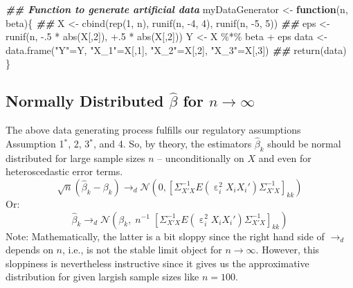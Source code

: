 \documentclass[
  14pt,
]{memoir}
\newenvironment{Shaded}{\begin{snugshade}}{\end{snugshade}}
\newcommand{\ControlFlowTok}[1]{\textcolor[rgb]{0.13,0.29,0.53}{\textbf{#1}}}
\newcommand{\DecValTok}[1]{\textcolor[rgb]{0.00,0.00,0.81}{#1}}
\newcommand{\DocumentationTok}[1]{\textcolor[rgb]{0.56,0.35,0.01}{\textbf{\textit{#1}}}}
\newcommand{\FunctionTok}[1]{\textcolor[rgb]{0.00,0.00,0.00}{#1}}
\newcommand{\NormalTok}[1]{#1}
\newcommand{\OtherTok}[1]{\textcolor[rgb]{0.56,0.35,0.01}{#1}}
\newcommand{\SpecialCharTok}[1]{\textcolor[rgb]{0.00,0.00,0.00}{#1}}
\newcommand{\StringTok}[1]{\textcolor[rgb]{0.31,0.60,0.02}{#1}}
\DeclareMathOperator{\eps}{\varepsilon}
\begin{document}
\begin{Shaded}
\begin{Highlighting}[]
\DocumentationTok{\#\# Function to generate artificial data}
\NormalTok{myDataGenerator }\OtherTok{\textless{}{-}} \ControlFlowTok{function}\NormalTok{(n, beta)\{}
  \DocumentationTok{\#\#}
\NormalTok{  X   }\OtherTok{\textless{}{-}} \FunctionTok{cbind}\NormalTok{(}\FunctionTok{rep}\NormalTok{(}\DecValTok{1}\NormalTok{, n), }
                 \FunctionTok{runif}\NormalTok{(n, }\SpecialCharTok{{-}}\DecValTok{4}\NormalTok{, }\DecValTok{4}\NormalTok{), }
                 \FunctionTok{runif}\NormalTok{(n, }\SpecialCharTok{{-}}\DecValTok{5}\NormalTok{, }\DecValTok{5}\NormalTok{))}
  \DocumentationTok{\#\#}
\NormalTok{  eps  }\OtherTok{\textless{}{-}} \FunctionTok{runif}\NormalTok{(n, }\SpecialCharTok{{-}}\NormalTok{.}\DecValTok{5} \SpecialCharTok{*} \FunctionTok{abs}\NormalTok{(X[,}\DecValTok{2}\NormalTok{]), }\SpecialCharTok{+}\NormalTok{.}\DecValTok{5} \SpecialCharTok{*} \FunctionTok{abs}\NormalTok{(X[,}\DecValTok{2}\NormalTok{]))}
\NormalTok{  Y    }\OtherTok{\textless{}{-}}\NormalTok{ X }\SpecialCharTok{\%*\%}\NormalTok{ beta }\SpecialCharTok{+}\NormalTok{ eps}
\NormalTok{  data }\OtherTok{\textless{}{-}} \FunctionTok{data.frame}\NormalTok{(}\StringTok{"Y"}\OtherTok{=}\NormalTok{Y, }
                     \StringTok{"X\_1"}\OtherTok{=}\NormalTok{X[,}\DecValTok{1}\NormalTok{], }\StringTok{"X\_2"}\OtherTok{=}\NormalTok{X[,}\DecValTok{2}\NormalTok{], }\StringTok{"X\_3"}\OtherTok{=}\NormalTok{X[,}\DecValTok{3}\NormalTok{])}
  \DocumentationTok{\#\#}
  \FunctionTok{return}\NormalTok{(data)}
\NormalTok{\}}
\end{Highlighting}
\end{Shaded}

\hypertarget{normally-distributed-hatbeta-for-ntoinfty}{%
\subsection{\texorpdfstring{Normally Distributed \(\hat\beta\) for \(n\to\infty\)}{Normally Distributed \textbackslash hat\textbackslash beta for n\textbackslash to\textbackslash infty}}\label{normally-distributed-hatbeta-for-ntoinfty}}

The above data generating process fulfills our regulatory assumptions Assumption 1\(^*\), 2, 3\(^*\), and 4. So, by theory, the estimators \(\hat\beta_k\) should be normal distributed for large sample sizes \(n\) -- unconditionally on \(X\) and even for heteroscedastic error terms.
\[
\sqrt{n}\left(\hat\beta_k-\beta_k\right)\to_d\mathcal{N}\left(0,\left[\Sigma_{X'X}^{-1}E(\eps^2_iX_iX_i')\Sigma_{X'X}^{-1}\right]_{kk}\right)
\]
Or:
\[
\hat\beta_k\to_d\mathcal{N}\left(\beta_k, \;n^{-1}\;\left[\Sigma_{X'X}^{-1}E(\eps^2_iX_iX_i')\Sigma_{X'X}^{-1}\right]_{kk}\right)
\]
Note: Mathematically, the latter is a bit sloppy since the right hand side of \(\to_d\) depends on \(n\), i.e., is not the stable limit object for \(n\to\infty\). However, this sloppiness is nevertheless instructive since it gives us the approximative distribution for given largish sample sizes like \(n=100\).
\end{document}

